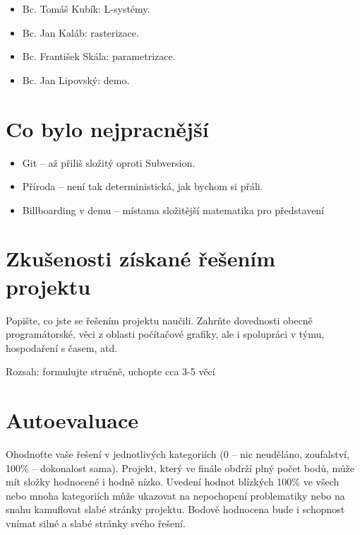 \documentclass[11pt,a4paper]{article}
\begin{document}
\begin{itemize}
\item Bc. Tomáš Kubík: L-systémy.
\item Bc. Jan Kaláb: rasterizace.
\item Bc. František Skála: parametrizace.
\item Bc. Jan Lipovský: demo.
\end{itemize}

\section{Co bylo nejpracnější}

%

\begin{itemize}
\item Git -- až přiliš složitý oproti Subversion.
\item Příroda -- není tak deterministická, jak bychom si přáli.
\item Billboarding v demu -- místama složitější matematika pro představení
\end{itemize}

\section{Zkušenosti získané řešením projektu}

Popište, co jste se řešením projektu naučili. Zahrňte dovednosti obecně
programátorské, věci z oblasti počítačové grafiky, ale i spolupráci v týmu,
hospodaření s časem, atd.

Rozsah: formulujte stručně, uchopte cca 3-5 věcí

\section{Autoevaluace}

Ohodnoťte vaše řešení v jednotlivých kategoriích (0 – nic neuděláno,
zoufalství, 100\% – dokonalost sama). Projekt, který ve finále obdrží plný
počet bodů, může mít složky hodnocené i hodně nízko. Uvedení hodnot blízkých
100\% ve všech nebo mnoha kategoriích může ukazovat na nepochopení problematiky
nebo na snahu kamuflovat slabé stránky projektu. Bodově hodnocena bude i
schopnost vnímat silné a slabé stránky svého řešení.
\end{document}
